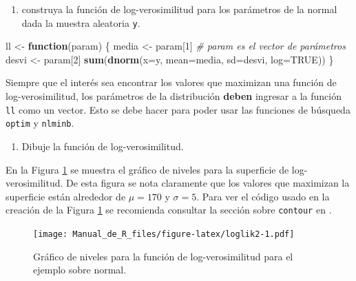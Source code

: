\documentclass[10pt,]{krantz}
\makeatletter
\newenvironment{Shaded}{\begin{snugshade}}{\end{snugshade}}
\newcommand{\KeywordTok}[1]{\textcolor[rgb]{0.13,0.29,0.53}{\textbf{#1}}}
\newcommand{\DataTypeTok}[1]{\textcolor[rgb]{0.13,0.29,0.53}{#1}}
\newcommand{\DecValTok}[1]{\textcolor[rgb]{0.00,0.00,0.81}{#1}}
\newcommand{\StringTok}[1]{\textcolor[rgb]{0.31,0.60,0.02}{#1}}
\newcommand{\CommentTok}[1]{\textcolor[rgb]{0.56,0.35,0.01}{\textit{#1}}}
\newcommand{\OtherTok}[1]{\textcolor[rgb]{0.56,0.35,0.01}{#1}}
\newcommand{\ControlFlowTok}[1]{\textcolor[rgb]{0.13,0.29,0.53}{\textbf{#1}}}
\newcommand{\NormalTok}[1]{#1}
\providecommand{\tightlist}{%
  \setlength{\itemsep}{0pt}\setlength{\parskip}{0pt}}
\newenvironment{kframe}{%
\medskip{}
\setlength{\fboxsep}{.8em}
 \def\at@end@of@kframe{}%
 \ifinner\ifhmode%
  \def\at@end@of@kframe{\end{minipage}}%
  \begin{minipage}{\columnwidth}%
 \fi\fi%
 \def\FrameCommand##1{\hskip\@totalleftmargin \hskip-\fboxsep
 \colorbox{shadecolor}{##1}\hskip-\fboxsep
     \hskip-\linewidth \hskip-\@totalleftmargin \hskip\columnwidth}%
 \MakeFramed {\advance\hsize-\width
   \@totalleftmargin\z@ \linewidth\hsize
   \@setminipage}}%
 {\par\unskip\endMakeFramed%
 \at@end@of@kframe}
\renewenvironment{Shaded}{\begin{kframe}}{\end{kframe}}
\let\BeginKnitrBlock\begin \let\EndKnitrBlock\end
\makeatother
\begin{document}
\begin{enumerate}
\def\labelenumi{\arabic{enumi})}
\tightlist
\item
  construya la función de log-verosimilitud para los parámetros de la
  normal dada la muestra aleatoria \texttt{y}.
\end{enumerate}

\begin{Shaded}
\begin{Highlighting}[]
\NormalTok{ll <-}\StringTok{ }\ControlFlowTok{function}\NormalTok{(param) \{}
\NormalTok{  media <-}\StringTok{ }\NormalTok{param[}\DecValTok{1}\NormalTok{]  }\CommentTok{# param es el vector de parámetros}
\NormalTok{  desvi <-}\StringTok{ }\NormalTok{param[}\DecValTok{2}\NormalTok{] }
  \KeywordTok{sum}\NormalTok{(}\KeywordTok{dnorm}\NormalTok{(}\DataTypeTok{x=}\NormalTok{y, }\DataTypeTok{mean=}\NormalTok{media, }\DataTypeTok{sd=}\NormalTok{desvi, }\DataTypeTok{log=}\OtherTok{TRUE}\NormalTok{))}
\NormalTok{\}}
\end{Highlighting}
\end{Shaded}

\BeginKnitrBlock{rmdwarning}
Siempre que el interés sea encontrar los valores que maximizan una
función de log-verosimilitud, los parámetros de la distribución
\textbf{deben} ingresar a la función \texttt{ll} como un vector. Esto se
debe hacer para poder usar las funciones de búsqueda \texttt{optim} y
\texttt{nlminb}.
\EndKnitrBlock{rmdwarning}

\begin{enumerate}
\def\labelenumi{\arabic{enumi})}
\setcounter{enumi}{1}
\tightlist
\item
  Dibuje la función de log-verosimilitud.
\end{enumerate}

En la Figura \ref{fig:loglik2} se muestra el gráfico de niveles para la
superficie de log-verosimilitud. De esta figura se nota claramente que
los valores que maximizan la superficie están alrededor de \(\mu=170\) y
\(\sigma=5\). Para ver el código usado en la creación de la Figura
\ref{fig:loglik2} se recomienda consultar la sección sobre
\texttt{contour} en \citet{hernandez_correa}.

\begin{figure}
\centering
\texttt{[image: Manual\_de\_R\_files/figure-latex/loglik2-1.pdf]}
\caption{\label{fig:loglik2}Gráfico de niveles para la función de
log-verosimilitud para el ejemplo sobre normal.}
\end{figure}
\end{document}
